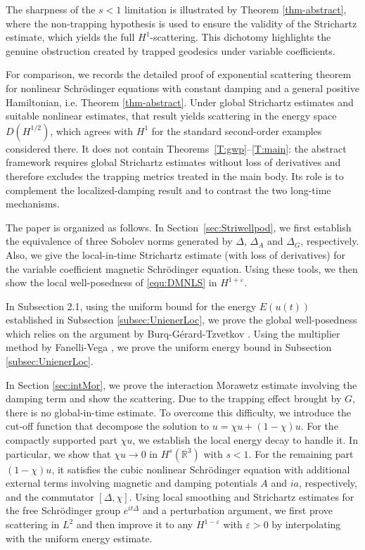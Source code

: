\documentclass[10pt%
]{amsart}
\numberwithin{equation}{section}
\newcommand{\R}{\mathbb{R}}
\theoremstyle{definition}
\begin{document}
The sharpness of the $s<1$ limitation is illustrated by Theorem \ref{thm-abstract}, where the non-trapping hypothesis is used to ensure the validity of the Strichartz estimate, which yields the full $H^1$-scattering. This dichotomy highlights the genuine obstruction created by trapped geodesics under variable coefficients.

For comparison, we  records the detailed  proof  of  exponential scattering theorem for nonlinear Schr\"odinger equations with constant damping and a general positive Hamiltonian, i.e. Theorem \ref{thm-abstract}. Under global Strichartz estimates and suitable nonlinear estimates, that result yields scattering in the energy space $D(H^{1/2})$, which agrees with $H^1$ for the standard second-order examples considered there. It does not contain Theorems~\ref{T:gwp}--\ref{T:main}: the abstract framework requires global Strichartz estimates without loss of derivatives and therefore excludes the trapping metrics treated in the main body. Its role is to complement the 
localized-damping result and to contrast the two long-time mechanisms.

The paper is organized as follows. In Section~\ref{sec:Striwellpod}, we first establish the equivalence of three Sobolev norms generated by $\Delta$, $\Delta_A$ and $\Delta_G$, respectively. Also, we give the local-in-time Strichartz estimate (with loss of derivatives) for the variable coefficient magnetic Schr\"odinger equation. Using these tools, we then show the local well-posedness of \eqref{equ:DMNLS} in $H^{1+\varepsilon}$. 

In Subsection 2.1, using the uniform bound for the energy $E(u(t))$ established in Subsection \ref{subsec:UnienerLoc}, we prove the global well-posedness which relies on the argument by Burq-G\'erard-Tzvetkov \cite{BGT}. Using the multiplier method by Fanelli-Vega \cite{Fanelli-Vega}, we prove the uniform energy bound in Subsection \ref{subsec:UnienerLoc}. 

In Section \ref{sec:intMor}, we prove the interaction Morawetz estimate involving the damping term and show the scattering. Due to the trapping effect brought by $G$, there is no global-in-time estimate. To overcome this difficulty, we introduce the cut-off function that decompose the solution to $u=\chi u+(1-\chi)u$. For the compactly supported part $\chi u$, we establish the local energy decay to handle it.  In particular, we show that $\chi u\to0$ in $H^s(\R^3)$ with $s<1$. For the remaining part $(1-\chi)u$, it satisfies the cubic nonlinear Schr\"odinger equation with additional external terms involving magnetic and damping potentials $A$ and $ia$, respectively,  and the commutator $[\Delta,\chi]$. Using local smoothing and Strichartz estimates for the free Schr\"odinger group $e^{it\Delta}$ and a perturbation argument, we first prove scattering in $L^2$ and then improve it to any $H^{1-\varepsilon}$ with $\varepsilon>0$ by interpolating with the uniform energy estimate.
\end{document}
